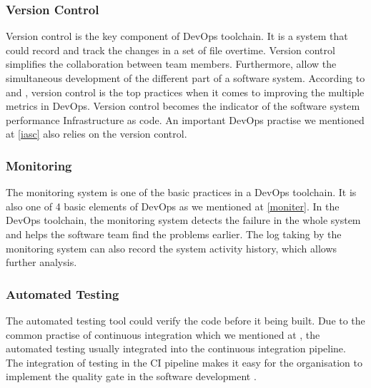 \subsubsection{Version Control}
Version control is the key component of DevOps toolchain. It is a system that could record and track the changes in a set of file overtime. Version control simplifies the collaboration between team members. Furthermore, allow the simultaneous development of the different part of a software system. According to \cite{Sourcean53:online} and \cite{velasquez2014state}, version control is the top practices when it comes to improving the multiple metrics in DevOps. Version control becomes the indicator of the software system performance \cite{Sourcean53:online} Infrastructure as code. An important DevOps practise we mentioned at \ref{iasc} also relies on the version control.
\subsubsection{Monitoring}
The monitoring system is one of the basic practices in a DevOps toolchain\cite{forsgren20192019}. It is also one of 4 basic elements of DevOps as we mentioned at \ref{moniter}. In the DevOps toolchain, the monitoring system detects the failure in the whole system and helps the software team find the problems earlier. The log taking by the monitoring system can also record the system activity history, which allows further analysis.
\subsubsection{Automated Testing}
The automated testing tool could verify the code before it being built. Due to the common practise of continuous integration which we mentioned at \label{CD}, the automated testing usually integrated into the continuous integration pipeline. The integration of testing in the CI pipeline makes it easy for the organisation to implement the quality gate in the software development \cite{huttermann2012devops}.
